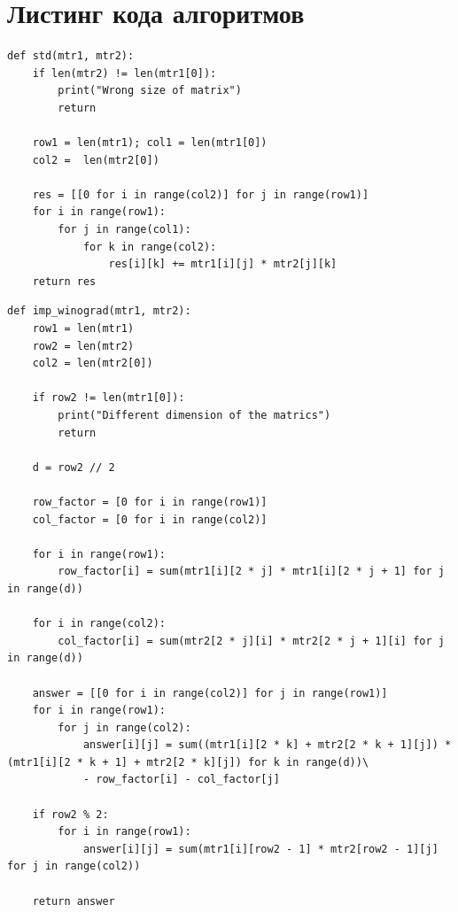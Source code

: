 \documentclass[12pt]{report}
\begin{document}
\section{Листинг кода алгоритмов}

\begin{lstlisting}[label=CodeStand,caption= Стандартный алгоритм умножения матриц]
def std(mtr1, mtr2):
	if len(mtr2) != len(mtr1[0]):
		print("Wrong size of matrix")
		return

	row1 = len(mtr1); col1 = len(mtr1[0])
	col2 =  len(mtr2[0])

	res = [[0 for i in range(col2)] for j in range(row1)]
	for i in range(row1):
		for j in range(col1):
			for k in range(col2):
				res[i][k] += mtr1[i][j] * mtr2[j][k]
	return res
\end{lstlisting}

\begin{lstlisting}[label=winograd_opt,caption=Оптимизированный алгорит Винограда]
def imp_winograd(mtr1, mtr2):
	row1 = len(mtr1)
	row2 = len(mtr2)
	col2 = len(mtr2[0])

	if row2 != len(mtr1[0]):
		print("Different dimension of the matrics")
		return

	d = row2 // 2

	row_factor = [0 for i in range(row1)]
	col_factor = [0 for i in range(col2)]

	for i in range(row1):
		row_factor[i] = sum(mtr1[i][2 * j] * mtr1[i][2 * j + 1] for j in range(d))

	for i in range(col2):
		col_factor[i] = sum(mtr2[2 * j][i] * mtr2[2 * j + 1][i] for j in range(d))

	answer = [[0 for i in range(col2)] for j in range(row1)]
	for i in range(row1):
		for j in range(col2):
			answer[i][j] = sum((mtr1[i][2 * k] + mtr2[2 * k + 1][j]) * (mtr1[i][2 * k + 1] + mtr2[2 * k][j]) for k in range(d))\
			- row_factor[i] - col_factor[j]

	if row2 % 2:
		for i in range(row1):
			answer[i][j] = sum(mtr1[i][row2 - 1] * mtr2[row2 - 1][j] for j in range(col2))

	return answer
\end{lstlisting}
\end{document}
